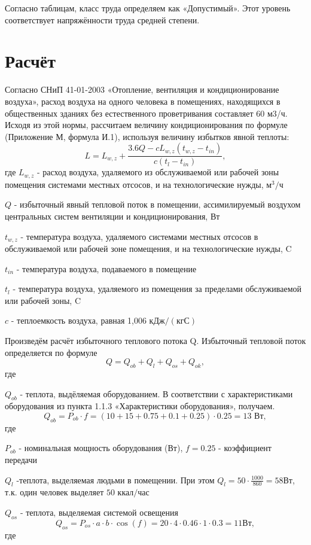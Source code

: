 Согласно таблицам, класс труда определяем как «Допустимый». Этот уровень соответ\-ствует напряжённости труда средней степени.

\section{Расчёт}

Согласно СНиП 41-01-2003 «Отопление, вентиляция и кондиционирование воздуха», расход воздуха на одного человека в помещениях, находящихся в общественных зданиях без естественного проветривания составляет 60 м3/ч. Исходя из этой нормы, рассчитаем величину кондиционирования по формуле (Приложение М, формула И.1), используя вели\-чину избытков явной теплоты:
$$
L = L_{w,z} + \frac{3.6Q - cL_{w,z}(t_{w,z} - t_{in})}{c(t_{l}-t_{in})},
$$
где
$L_{w,z}$ - расход воздуха, удаляемого из обслуживаемой или рабочей зоны помещения системами местных отсосов, и на технологические нужды,  $\mbox{м}^3/\mbox{ч}$

$Q$ - избыточный явный тепловой поток в помещении, ассимилируемый воздухом центральных систем вентиляции и кондиционирования, Вт

$t_{w,z}$ - температура воздуха, удаляемого системами местных отсосов в обслу\-живаемой или рабочей зоне помещения, и на технологические нужды, C

$t_{in}$ - температура воздуха, подаваемого в помещение

$t_{l}$ - температура воздуха, удаляемого из помещения за пределами обслу\-живаемой или рабочей зоны, C

$c$ - теплоемкость воздуха, равная 1,006 $\mbox{кДж}/(\mbox{кгС})$

Произведём расчёт избыточного теплового потока Q. Избыточный тепло\-вой поток определяется по формуле
$$
Q = Q_{ob} + Q_{l} + Q_{os} + Q_{ok},
$$
где 

$Q_{ob}$ - теплота, выдёляемая оборудованием. В соответствии с характерис\-тиками обору\-дования из пункта 1.1.3 «Характеристики оборудования», по\-лучаем.
$$
Q_{ob} = P_{ob}\cdot f = (10+15+0.75+0.1+0.25)\cdot 0.25 = 13 \mbox{ Вт},
$$
где

$P_{ob}$ - номинальная мощность оборудования (Вт), $f=0.25$ - коэффициент передачи

 $Q_{l}$ -теплота, выделяемая людьми в помещении. При этом $Q_{l} = 50\cdot \frac{1000}{860} = 58 \mbox{Вт}$, т.к. один человек выделяет $50 \mbox{ ккал/час}$

$Q_{os}$ - теплота, выделяемая системой освещения
$$
Q_{os} = P_{os} \cdot a \cdot b \cdot \cos(f) = 20 \cdot 4 \cdot 0.46 \cdot 1 \cdot 0.3 = 11 \mbox{Вт},
$$
где

